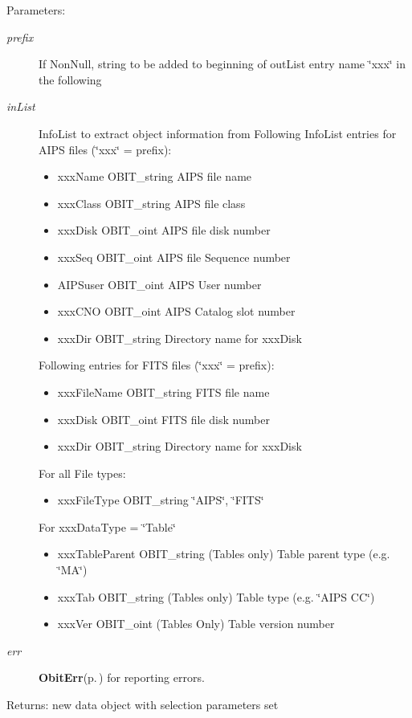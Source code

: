 \begin{Desc}
\item[Parameters:]
\begin{description}
\item[{\em prefix}]If Non\-Null, string to be added to beginning of out\-List entry name \char`\"{}xxx\char`\"{} in the following \item[{\em in\-List}]Info\-List to extract object information from Following Info\-List entries for AIPS files (\char`\"{}xxx\char`\"{} = prefix): \begin{itemize}
\item xxx\-Name OBIT\_\-string AIPS file name \item xxx\-Class OBIT\_\-string AIPS file class \item xxx\-Disk OBIT\_\-oint AIPS file disk number \item xxx\-Seq OBIT\_\-oint AIPS file Sequence number \item AIPSuser OBIT\_\-oint AIPS User number \item xxx\-CNO OBIT\_\-oint AIPS Catalog slot number \item xxx\-Dir OBIT\_\-string Directory name for xxx\-Disk\end{itemize}
Following entries for FITS files (\char`\"{}xxx\char`\"{} = prefix): \begin{itemize}
\item xxx\-File\-Name OBIT\_\-string FITS file name \item xxx\-Disk OBIT\_\-oint FITS file disk number \item xxx\-Dir OBIT\_\-string Directory name for xxx\-Disk\end{itemize}
For all File types: \begin{itemize}
\item xxx\-File\-Type OBIT\_\-string \char`\"{}AIPS\char`\"{}, \char`\"{}FITS\char`\"{}\end{itemize}
For xxx\-Data\-Type = \char`\"{}Table\char`\"{} \begin{itemize}
\item xxx\-Table\-Parent OBIT\_\-string (Tables only) Table parent type (e.g. \char`\"{}MA\char`\"{}) \item xxx\-Tab OBIT\_\-string (Tables only) Table type (e.g. \char`\"{}AIPS CC\char`\"{}) \item xxx\-Ver OBIT\_\-oint (Tables Only) Table version number\end{itemize}
\item[{\em err}]{\bf Obit\-Err}{\rm (p.\,\pageref{structObitErr})} for reporting errors. \end{description}
\end{Desc}
\begin{Desc}
\item[Returns:]new data object with selection parameters set \end{Desc}
